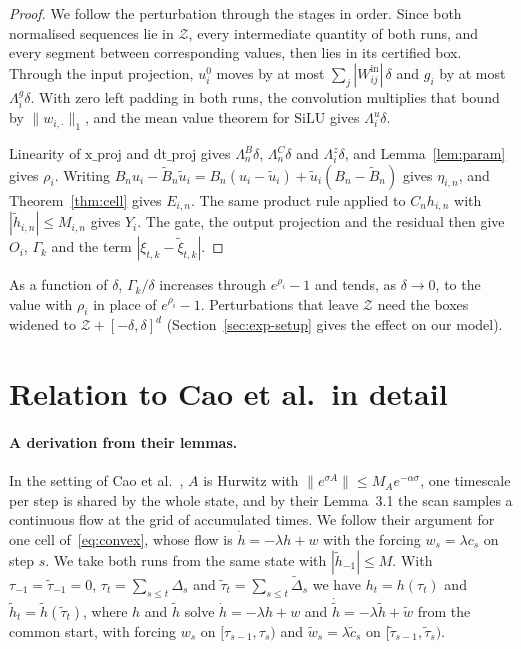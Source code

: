 \documentclass[11pt, a4paper]{article}
\theoremstyle{remark}
\theoremstyle{plain}
\begin{document}
\begin{proof}
We follow the perturbation through the stages in order. Since both normalised sequences lie in
$\mathcal{Z}$, every intermediate quantity of both runs, and every segment between
corresponding values, then lies in its certified box. Through the input projection, $u^{0}_i$ moves by
at most $\sum_j |W^{\mathrm{in}}_{ij}|\,\delta$ and $g_i$ by at most $\Lambda^{g}_i\delta$. With zero
left padding in both runs, the convolution multiplies that bound by $\|w_{i,\cdot}\|_1$, and the
mean value theorem for $\mathrm{SiLU}$ gives $\Lambda^{u}_i\delta$.

Linearity of $\mathrm{x\_proj}$ and $\mathrm{dt\_proj}$ gives $\Lambda^{B}_n\delta$, $\Lambda^{C}_n\delta$
and $\Lambda^{z}_i\delta$, and Lemma~\ref{lem:param} gives $\rho_i$. Writing
$B_n u_i - \tilde B_n\tilde u_i = B_n(u_i - \tilde u_i) + \tilde u_i(B_n - \tilde B_n)$ gives
$\eta_{i,n}$, and Theorem~\ref{thm:cell} gives $E_{i,n}$. The same product rule applied to
$C_n h_{i,n}$ with $|\tilde h_{i,n}| \le M_{i,n}$ gives $Y_i$. The gate, the output projection
and the residual then give $O_i$, $\Gamma_k$ and the term $|\xi_{t,k} - \tilde\xi_{t,k}|$.
\end{proof}

As a function of $\delta$, $\Gamma_k/\delta$ increases through $e^{\rho_i} - 1$ and tends, as
$\delta \to 0$, to the value with $\rho_i$ in place of $e^{\rho_i} - 1$. Perturbations that leave
$\mathcal{Z}$ need the boxes widened to $\mathcal{Z} + [-\delta, \delta]^{d}$
(Section~\ref{sec:exp-setup} gives the effect on our model).

\section{Relation to Cao et al.\ in detail}
\label{app:cao}

\paragraph{A derivation from their lemmas.}
In the setting of Cao et al.\ \citep{cao2026control}, $A$ is Hurwitz with
$\|e^{\sigma A}\| \le M_A e^{-\alpha\sigma}$, one timescale per step is shared by the whole state,
and by their Lemma~3.1 the scan samples a continuous flow at the grid of accumulated times. We
follow their argument for one cell of~\eqref{eq:convex}, whose flow is
$\dot h = -\lambda h + w$ with the forcing $w_s = \lambda c_s$ on step $s$. We take both runs
from the same state with $|\tilde h_{-1}| \le M$. With $\tau_{-1} = \tilde\tau_{-1} = 0$,
$\tau_t = \sum_{s \le t}\Delta_s$ and $\tilde\tau_t = \sum_{s \le t}\tilde\Delta_s$ we have
$h_t = h(\tau_t)$ and $\tilde h_t = \tilde h(\tilde\tau_t)$, where $h$ and $\tilde h$ solve
$\dot h = -\lambda h + w$ and $\dot{\tilde h} = -\lambda\tilde h + \tilde w$ from the common
start, with forcing $w_s$ on $[\tau_{s-1}, \tau_s)$ and $\tilde w_s = \lambda\tilde c_s$ on
$[\tilde\tau_{s-1}, \tilde\tau_s)$.
\end{document}
